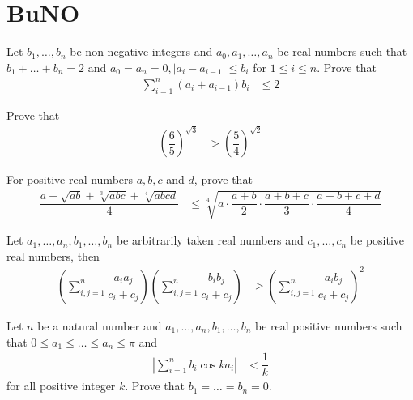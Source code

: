 \documentclass{subfile}
\begin{document}
	\section{BuNO}\label{sec:buno}
	
		\begin{problem}
			Let $b_{1},\ldots,b_{n}$ be non-negative integers and $a_{0},a_{1},\ldots,a_{n}$ be real numbers such that $b_{1}+\ldots+b_{n}=2$ and $a_{0}=a_{n}=0,|a_{i}-a_{i-1}|\leq b_{i}$ for $1\leq i\leq n$. Prove that
				\begin{align*}
					\sum_{i=1}^{n}(a_{i}+a_{i-1})b_{i}
						& \leq 2
				\end{align*}
		\end{problem}
	
		\begin{problem}[$2018$, problem $3$]
			Prove that
				\begin{align*}
					\left(\dfrac{6}{5}\right)^{\sqrt{3}}
						& > \left(\dfrac{5}{4}\right)^{\sqrt{2}}
				\end{align*}
		\end{problem}
	
		\begin{problem}[$2016$, problem $3$]
			For positive real numbers $a,b,c$ and $d$, prove that
				\begin{align*}
					\dfrac{a+\sqrt{ab}+\sqrt[3]{abc}+\sqrt[4]{abcd}}{4}
						& \leq \sqrt[4]{a\cdot\dfrac{a+b}{2}\cdot\dfrac{a+b+c}{3}\cdot\dfrac{a+b+c+d}{4}}
				\end{align*}
		\end{problem}
	
		\begin{problem}[$2009$, problem $6$]
			Let $a_{1},\ldots,a_{n},b_{1},\ldots,b_{n}$ be arbitrarily taken real numbers and $c_{1},\ldots,c_{n}$ be positive real numbers, then
				\begin{align*}
					\left(\sum_{i,j=1}^{n}\dfrac{a_{i}a_{j}}{c_{i}+c_{j}}\right)\left(\sum_{i,j=1}^{n}\dfrac{b_{i}b_{j}}{c_{i}+c_{j}}\right)
						& \geq \left(\sum_{i,j=1}^{n}\dfrac{a_{i}b_{j}}{c_{i}+c_{j}}\right)^{2}
				\end{align*}
		\end{problem}
	
		\begin{problem}[$2008$, problem $3$]
			Let $n$ be a natural number and $a_{1},\ldots,a_{n},b_{1},\ldots,b_{n}$ be real positive numbers such that $0\leq a_{1}\leq\ldots\leq a_{n}\leq\pi$ and
				\begin{align*}
					\left|\sum_{i=1}^{n}b_{i}\cos{ka_{i}}\right|
						& < \dfrac{1}{k}
				\end{align*}
			for all positive integer $k$. Prove that $b_{1}=\ldots=b_{n}=0$.
		\end{problem}
	
\end{document}
